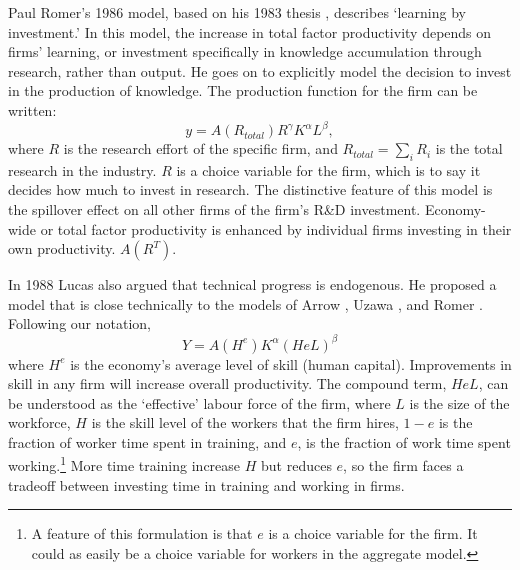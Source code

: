 
Paul Romer's 1986 model, based on his 1983 thesis \cite{romerIncreasingReturnsLongRun1986}, describes `learning by investment.' In this model, the increase in {total factor productivity} depends on firms' learning, or investment specifically in knowledge accumulation through research, rather than output. He goes on to explicitly model the decision to invest in the production of knowledge. The production function  for the firm can be written: 
\[y = A(R_{total})R^\gamma  K^\alpha L^\beta, \]
where $R$ is the research effort of the specific firm, and $R_{total}=\sum_iR_i$ is the total research in the industry.  $R$ is a choice variable for the firm, which is to say %
it decides how much to invest in research. The distinctive feature of this model is the spillover effect on all other firms of the firm's R\&D investment. Economy-wide or  \gls{total factor productivity} is enhanced by individual firms investing in their own productivity. $A(R^T)$. %

In 1988 Lucas also argued that technical progress is endogenous. He proposed a model that is close technically to the models of Arrow \cite{arrowEconomicImplicationsLearning1962}, Uzawa \cite{uzawaOptimumTechnicalChange1965}, and Romer \cite{romerIncreasingReturnsLongRun1986}. Following our notation, 
\[ Y = A(H^e) K^\alpha (HeL)^\beta \] 
where $H^e$ is the economy's average level of skill (human capital).  Improvements in skill in any firm will increase overall productivity. The compound term, $HeL$,  can be understood as the `effective' labour force of the firm, where $L$ is the size of the workforce, $H$ is the skill level of the workers that the firm hires,  $1-e$ is the fraction of worker time spent in training, and $e$, is the fraction of work time spent working.\footnote{A feature of this formulation is that $e$ is a choice variable for the firm. It could as easily be a choice variable for workers in the aggregate model.} 
More time training increase $H$ but reduces $e$, so the firm faces a tradeoff between investing time in training and working in firms.

